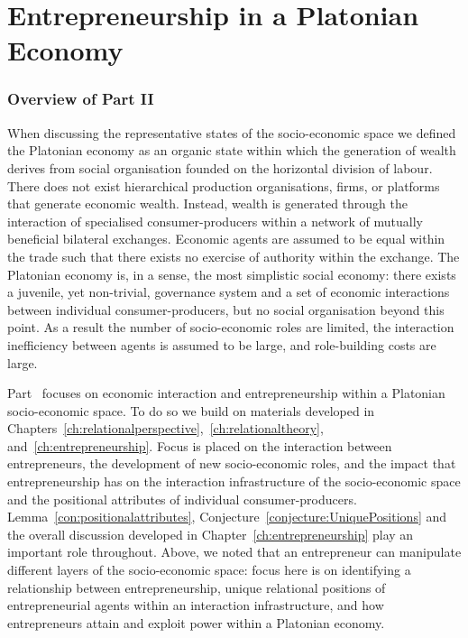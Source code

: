 \part{Entrepreneurship in a Platonian Economy} 
\label{part:entrepreneurshipPlatonianEconomy}

\section*{Overview of Part II}

When discussing the representative states of the socio-economic space we defined the Platonian economy as an organic state within which the generation of wealth derives from social organisation founded on the horizontal division of labour. There does not exist hierarchical production organisations, firms, or platforms that generate economic wealth. Instead, wealth is generated through the interaction of specialised consumer-producers within a network of mutually beneficial bilateral exchanges. Economic agents are assumed to be equal within the trade such that there exists no exercise of authority within the exchange. The Platonian economy is, in a sense, the most simplistic social economy: there exists a juvenile, yet non-trivial, governance system and a set of economic interactions between individual consumer-producers, but no social organisation beyond this point. As a result the number of socio-economic roles are limited, the interaction inefficiency between agents is assumed to be large, and role-building costs are large.

Part~\ref{part:entrepreneurshipPlatonianEconomy} focuses on economic interaction and entrepreneurship within a Platonian socio-economic space. To do so we build on materials developed in Chapters~\ref{ch:relationalperspective},~\ref{ch:relationaltheory}, and~\ref{ch:entrepreneurship}. Focus is placed on the interaction between entrepreneurs, the development of new socio-economic roles, and the impact that entrepreneurship has on the interaction infrastructure of the socio-economic space and the positional attributes of individual consumer-producers. Lemma~\ref{con:positionalattributes}, Conjecture~\ref{conjecture:UniquePositions} and the overall discussion developed in Chapter~\ref{ch:entrepreneurship} play an important role throughout. Above, we noted that an entrepreneur can manipulate different layers of the socio-economic space: focus here is on identifying a relationship between entrepreneurship, unique relational positions of entrepreneurial agents within an interaction infrastructure, and how entrepreneurs attain and exploit power within a Platonian economy.

